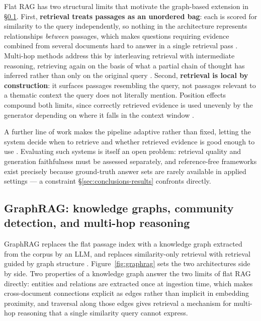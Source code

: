 Flat RAG has two structural limits that motivate the graph-based extension in \S\ref{sec:graphrag}. First, \textbf{retrieval treats passages as an unordered bag}: each is scored for similarity to the query independently, so nothing in the architecture represents relationships \emph{between} passages, which makes questions requiring evidence combined from several documents hard to answer in a single retrieval pass \citep{yang2018hotpotqa}. Multi-hop methods address this by interleaving retrieval with intermediate reasoning, retrieving again on the basis of what a partial chain of thought has inferred rather than only on the original query \citep{trivedi2023interleaving}. Second, \textbf{retrieval is local by construction}: it surfaces passages resembling the query, not passages relevant to a thematic context the query does not literally mention. Position effects compound both limits, since correctly retrieved evidence is used unevenly by the generator depending on where it falls in the context window \citep{liu2024lost}.

A further line of work makes the pipeline adaptive rather than fixed, letting the system decide when to retrieve and whether retrieved evidence is good enough to use \citep{asai2024self}. Evaluating such systems is itself an open problem: retrieval quality and generation faithfulness must be assessed separately, and reference-free frameworks exist precisely because ground-truth answer sets are rarely available in applied settings \citep{es2024ragas,chen2024benchmarking} — a constraint \S\ref{sec:conclusions-results} confronts directly.

\subsection{GraphRAG: knowledge graphs, community detection, and multi-hop reasoning}
\label{sec:graphrag}

GraphRAG replaces the flat passage index with a knowledge graph extracted from the corpus by an LLM, and replaces similarity-only retrieval with retrieval guided by graph structure \citep{edge2024local}. Figure~\ref{fig:graphrag} sets the two architectures side by side. Two properties of a knowledge graph answer the two limits of flat RAG directly: entities and relations are extracted once at ingestion time, which makes cross-document connections explicit as edges rather than implicit in embedding proximity, and traversal along those edges gives retrieval a mechanism for multi-hop reasoning that a single similarity query cannot express.

